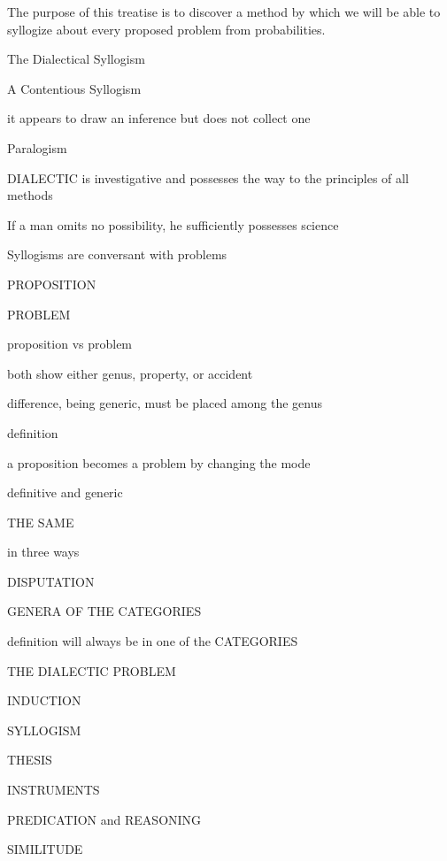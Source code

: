 The purpose of this treatise  is to discover a method by which we will be able
to syllogize about every proposed problem from probabilities.

The Dialectical Syllogism

A Contentious Syllogism

it appears to draw an inference but does not collect one

Paralogism

DIALECTIC is investigative and possesses the way to the principles of all methods

If a man omits no possibility, he sufficiently possesses science

Syllogisms are conversant with problems

PROPOSITION


PROBLEM 

proposition vs problem

both show either genus, property, or accident

difference, being generic, must be placed among the genus

definition

a proposition becomes a problem by changing the mode

definitive and generic

THE SAME

in three ways

DISPUTATION

GENERA OF THE CATEGORIES

definition will always be in one of the CATEGORIES

THE DIALECTIC PROBLEM

INDUCTION

SYLLOGISM 

THESIS 

INSTRUMENTS

PREDICATION and REASONING

SIMILITUDE

